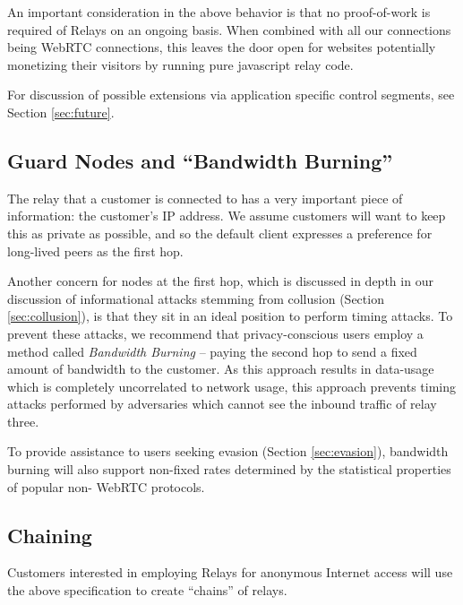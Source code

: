 
An important consideration in the above behavior is that no
proof-of-work is required of Relays on an ongoing basis. When combined
with all our connections being WebRTC connections, this leaves the
door open for websites potentially monetizing their visitors by
running pure javascript relay code.

For discussion of possible extensions via application specific control
segments, see Section \ref{sec:future}.

\subsection*{Guard Nodes and ``Bandwidth Burning''}
\label{bandwidth-burning}

The relay that a customer is connected to has a very important piece
of information: the customer’s IP address. We assume customers will
want to keep this as private as possible, and so the default client
expresses a preference for long-lived peers as the first
hop.

Another concern for nodes at the first hop, which is discussed in
depth in our discussion of informational attacks stemming from
collusion (Section \ref{sec:collusion}), is that they sit in an ideal
position to perform timing attacks. To prevent these attacks, we
recommend that privacy-conscious users employ a method called
\emph{Bandwidth Burning} -- paying the second hop to send a fixed
amount of bandwidth to the customer. As this approach results in
data-usage which is completely uncorrelated to network usage, this
approach prevents timing attacks performed by adversaries which cannot
see the inbound traffic of relay three.

To provide assistance to users seeking evasion (Section
\ref{sec:evasion}), bandwidth burning will also support non-fixed
rates determined by the statistical properties of popular non-\Orchid{}
WebRTC protocols.

\subsection*{Chaining}

Customers interested in employing Relays for anonymous Internet
access will use the above specification to create ``chains'' of
relays.

